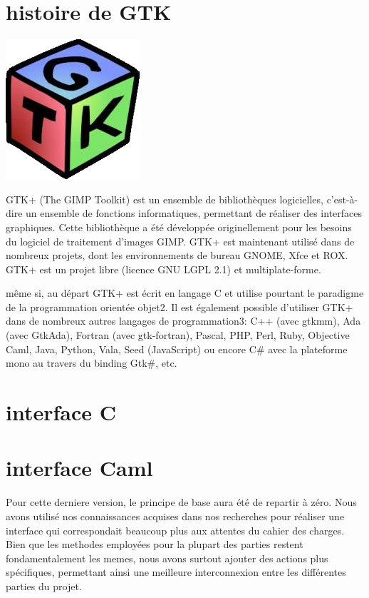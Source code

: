 \documentclass[12pt]{report}
\begin{document}
	\section {histoire de GTK}

\begin{center}
\includegraphics[scale = 1]{GTK.png}
\end{center}

GTK+ (The GIMP Toolkit) est un ensemble de bibliothèques logicielles, c'est-à-dire un ensemble de fonctions informatiques, permettant de réaliser des interfaces graphiques. Cette bibliothèque a été développée originellement pour les besoins du logiciel de traitement d'images GIMP. GTK+ est maintenant utilisé dans de nombreux projets, dont les environnements de bureau GNOME, Xfce et ROX.
GTK+ est un projet libre (licence GNU LGPL 2.1) et multiplate-forme.

même si, au départ GTK+ est écrit en langage C et utilise pourtant le paradigme de la programmation orientée objet2. Il est également possible d'utiliser GTK+ dans de nombreux autres langages de programmation3: C++ (avec gtkmm), Ada (avec GtkAda), Fortran (avec gtk-fortran), Pascal, PHP, Perl, Ruby, Objective Caml, Java, Python, Vala, Seed (JavaScript) ou encore C\# avec la plateforme mono au travers du binding Gtk\#, etc.

	\section{interface C}

	\section{interface Caml}

Pour cette derniere version, le principe de base aura été de repartir à zéro. Nous avons utilisé nos connaissances acquises dans nos recherches pour réaliser une interface qui correspondait beaucoup plus aux attentes du cahier des charges. Bien que les methodes employées pour la plupart des parties restent fondamentalement les memes, nous avons surtout ajouter des actions plus spécifiques, permettant ainsi une meilleure interconnexion entre les différentes parties du projet.
\end{document}
